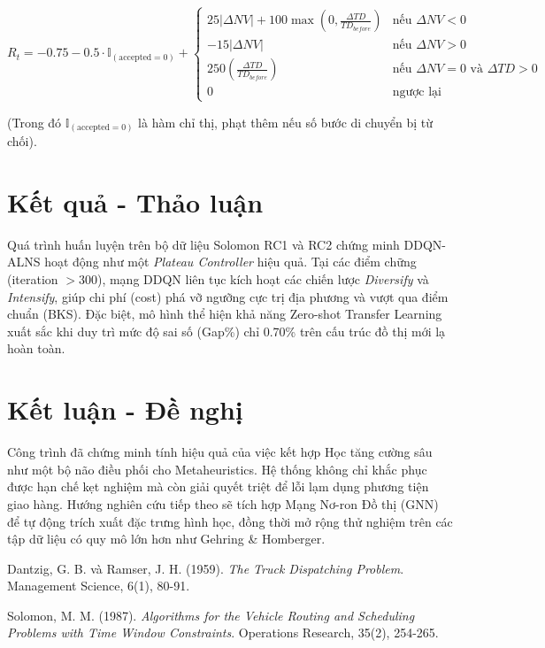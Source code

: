 \documentclass[13pt, a4paper]{extarticle} %
\begin{document}
\[
R_t = -0.75 - 0.5 \cdot \mathbb{I}_{(\text{accepted} = 0)} + 
\begin{cases} 
25|\Delta NV| + 100 \max\left(0, \frac{\Delta TD}{TD_{before}}\right) & \text{nếu } \Delta NV < 0 \\ 
-15|\Delta NV| & \text{nếu } \Delta NV > 0 \\ 
250 \left(\frac{\Delta TD}{TD_{before}}\right) & \text{nếu } \Delta NV = 0 \text{ và } \Delta TD > 0 \\ 
0 & \text{ngược lại} 
\end{cases}
\]

(Trong đó $\mathbb{I}_{(\text{accepted} = 0)}$ là hàm chỉ thị, phạt thêm nếu số bước di chuyển bị từ chối).

\section{Kết quả - Thảo luận}
Quá trình huấn luyện trên bộ dữ liệu Solomon RC1 và RC2 chứng minh DDQN-ALNS hoạt động như một \textit{Plateau Controller} hiệu quả. Tại các điểm chững (iteration $> 300$), mạng DDQN liên tục kích hoạt các chiến lược \textit{Diversify} và \textit{Intensify}, giúp chi phí (cost) phá vỡ ngưỡng cực trị địa phương và vượt qua điểm chuẩn (BKS). Đặc biệt, mô hình thể hiện khả năng Zero-shot Transfer Learning xuất sắc khi duy trì mức độ sai số (Gap\%) chỉ 0.70\% trên cấu trúc đồ thị mới lạ hoàn toàn.

\section{Kết luận - Đề nghị}
Công trình đã chứng minh tính hiệu quả của việc kết hợp Học tăng cường sâu như một bộ não điều phối cho Metaheuristics. Hệ thống không chỉ khắc phục được hạn chế kẹt nghiệm mà còn giải quyết triệt để lỗi lạm dụng phương tiện giao hàng. Hướng nghiên cứu tiếp theo sẽ tích hợp Mạng Nơ-ron Đồ thị (GNN) để tự động trích xuất đặc trưng hình học, đồng thời mở rộng thử nghiệm trên các tập dữ liệu có quy mô lớn hơn như Gehring \& Homberger.

\newpage
\begin{thebibliography}{}

Dantzig, G. B. và Ramser, J. H. (1959). \textit{The Truck Dispatching Problem}. Management Science, 6(1), 80-91.

Solomon, M. M. (1987). \textit{Algorithms for the Vehicle Routing and Scheduling Problems with Time Window Constraints}. Operations Research, 35(2), 254-265.

\end{thebibliography}
\end{document}
